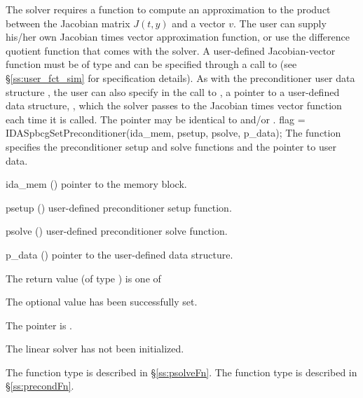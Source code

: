 The 
{\idaspbcg} solver requires a function to compute an approximation to the
product between the Jacobian matrix $J(t,y)$ and a vector $v$.
The user can supply his/her own Jacobian times vector approximation function, 
or use the difference quotient function  
that comes with the {\idaspbcg} solver.
A user-defined Jacobian-vector function must be of type  and 
can be specified through a call to  
(see \S\ref{ss:user_fct_sim} for specification details).
As with the preconditioner user data structure , 
the user can also specify in the call to , a pointer to a 
user-defined data structure, , which
the {\idaspbcg} solver passes to the Jacobian times vector function 
each time it is called.  
The pointer  may be identical to  and/or .
{
  flag = IDASpbcgSetPreconditioner(ida\_mem, psetup, psolve, p\_data);
}
{
  The function  specifies the preconditioner
  setup and solve functions and the pointer to user data.
}
{
  \begin{args}
  \item[ida\_mem] ()
    pointer to the {\ida} memory block.
  \item[psetup] ()
    user-defined preconditioner setup function.
  \item[psolve] ()
    user-defined preconditioner solve function.
  \item[p\_data] ()
     pointer to the user-defined data structure.
  \end{args}
}
{
  The return value  (of type ) is one of
  \begin{args}
  \item[\Id{IDASPBCG\_SUCCESS}] 
    The optional value has been successfully set.
  \item[\Id{IDASPBCG\_MEM\_NULL}]
    The  pointer is .
  \item[\Id{IDASPBCG\_LMEM\_NULL}]
    The {\idaspgmr} linear solver has not been initialized.
  \end{args}
}
{
   The function type  is described in \S\ref{ss:psolveFn}.
   The function type  is described in \S\ref{ss:precondFn}.
}
